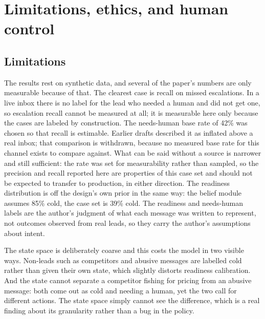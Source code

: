 \documentclass{article}
\begin{document}
\section{Limitations, ethics, and human control}
\label{sec:limitations}

\subsection{Limitations}
The results rest on synthetic data, and several of the paper's numbers are only
measurable because of that. The clearest case is recall on missed escalations. In
a live inbox there is no label for the lead who needed a human and did not get
one, so escalation recall cannot be measured at all; it is measurable here only
because the cases are labeled by construction. The needs-human base rate of 42\%
was chosen so that recall is estimable. Earlier drafts described it as inflated
above a real inbox; that comparison is withdrawn, because no measured base rate for
this channel exists to compare against. What can be said without a source is
narrower and still sufficient: the rate was set for measurability rather than
sampled, so the precision and recall reported here are properties of this case set
and should not be expected to transfer to production, in either direction. The
readiness distribution is off the design's own prior in the same way: the belief
module assumes 85\% cold, the case set is 39\% cold.
The readiness and needs-human labels are the author's
judgment of what each message was written to represent, not outcomes observed from
real leads, so they carry the author's assumptions about intent.

The state space is deliberately coarse and this costs the model in two visible
ways. Non-leads such as competitors and abusive messages are labelled cold rather
than given their own state, which slightly distorts readiness calibration. And the
state cannot separate a competitor fishing for pricing from an abusive message:
both come out as cold and needing a human, yet the two call for different actions.
The state space simply cannot see the difference, which is a real finding about
its granularity rather than a bug in the policy.
\end{document}
